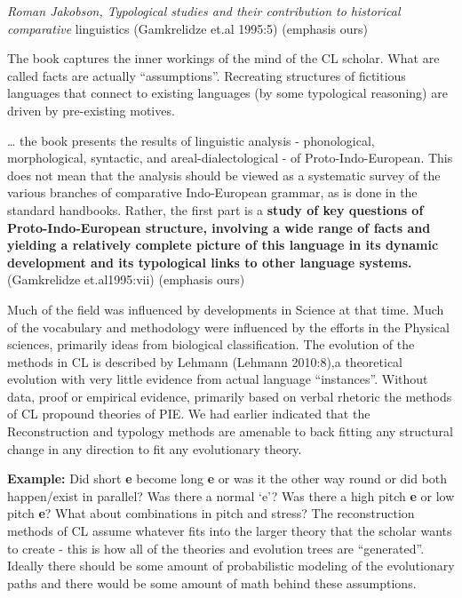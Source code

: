 \begin{myquote}
\textit{Roman Jakobson, Typological studies and their contribution to historical comparative} linguistics (Gamkrelidze et.al 1995:5) (emphasis ours)
\end{myquote}

The book captures the inner workings of the mind of the CL scholar. What are called facts are actually “assumptions”. Recreating structures of fictitious languages that connect to existing languages (by some typological reasoning) are driven by pre-existing motives.

\begin{myquote}
… the book presents the results of linguistic analysis - phonological, morphological, syntactic, and areal-dialectological - of Proto-Indo-European. This does not mean that the analysis should be viewed as a systematic survey of the various branches of comparative Indo-European grammar, as is done in the standard handbooks. Rather, the first part is a \textbf{study of key questions of Proto-Indo-European structure, involving a wide range of facts and yielding a relatively complete picture of this language in its dynamic development and its typological links to other language systems.} (Gamkrelidze et.al1995:vii) (emphasis ours)
\end{myquote}

Much of the field was influenced by developments in Science at that time. Much of the vocabulary and methodology were influenced by the efforts in the Physical sciences, primarily ideas from biological classification. The evolution of the methods in CL is described by Lehmann (Lehmann 2010:8),a theoretical evolution with very little evidence from actual language “instances”. Without data, proof or empirical evidence, primarily based on verbal rhetoric the methods of CL propound theories of PIE. We had earlier indicated that the Reconstruction and typology methods are amenable to back fitting any structural change in any direction to fit any evolutionary theory.

\textbf{Example:} Did short \textbf{e} become long \textbf{e} or was it the other way round or did both happen/exist in parallel? Was there a normal ‘e’? Was there a high pitch \textbf{e} or low pitch \textbf{e}? What about combinations in pitch and stress? The reconstruction methods of CL assume whatever fits into the larger theory that the scholar wants to create - this is how all of the theories and evolution trees are “generated”. Ideally there should be some amount of probabilistic modeling of the evolutionary paths and there would be some amount of math behind these assumptions.

